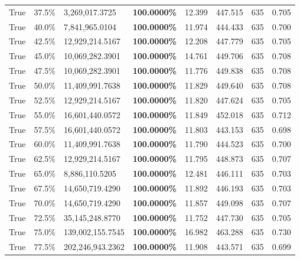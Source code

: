 \begin{table}[H]
\begin{tabular}{lllrllll}
\cline{1-8}
True & 37.5\% & 3,269,017.3725 & \bfseries \color{red} 100.0000\% & 12.399 & 447.515 & 635 & 0.705 \\
\cline{1-8}
True & 40.0\% & 7,841,965.0104 & \bfseries \color{red} 100.0000\% & 11.974 & 444.433 & 635 & 0.700 \\
\cline{1-8}
True & 42.5\% & 12,929,214.5167 & \bfseries \color{red} 100.0000\% & 12.208 & 447.779 & 635 & 0.705 \\
\cline{1-8}
True & 45.0\% & 10,069,282.3901 & \bfseries \color{red} 100.0000\% & 14.761 & 449.706 & 635 & 0.708 \\
\cline{1-8}
True & 47.5\% & 10,069,282.3901 & \bfseries \color{red} 100.0000\% & 11.776 & 449.838 & 635 & 0.708 \\
\cline{1-8}
True & 50.0\% & 11,409,991.7638 & \bfseries \color{red} 100.0000\% & 11.829 & 449.640 & 635 & 0.708 \\
\cline{1-8}
True & 52.5\% & 12,929,214.5167 & \bfseries \color{red} 100.0000\% & 11.820 & 447.624 & 635 & 0.705 \\
\cline{1-8}
True & 55.0\% & 16,601,440.0572 & \bfseries \color{red} 100.0000\% & 11.849 & 452.018 & 635 & 0.712 \\
\cline{1-8}
True & 57.5\% & 16,601,440.0572 & \bfseries \color{red} 100.0000\% & 11.803 & 443.153 & 635 & 0.698 \\
\cline{1-8}
True & 60.0\% & 11,409,991.7638 & \bfseries \color{red} 100.0000\% & 11.790 & 444.523 & 635 & 0.700 \\
\cline{1-8}
True & 62.5\% & 12,929,214.5167 & \bfseries \color{red} 100.0000\% & 11.795 & 448.873 & 635 & 0.707 \\
\cline{1-8}
True & 65.0\% & 8,886,110.5205 & \bfseries \color{red} 100.0000\% & 12.481 & 446.111 & 635 & 0.703 \\
\cline{1-8}
True & 67.5\% & 14,650,719.4290 & \bfseries \color{red} 100.0000\% & 11.892 & 446.193 & 635 & 0.703 \\
\cline{1-8}
True & 70.0\% & 14,650,719.4290 & \bfseries \color{red} 100.0000\% & 11.857 & 449.098 & 635 & 0.707 \\
\cline{1-8}
True & 72.5\% & 35,145,248.8770 & \bfseries \color{red} 100.0000\% & 11.752 & 447.730 & 635 & 0.705 \\
\cline{1-8}
True & 75.0\% & 139,002,155.7545 & \bfseries \color{red} 100.0000\% & 16.982 & 463.288 & 635 & 0.730 \\
\cline{1-8}
True & 77.5\% & 202,246,943.2362 & \bfseries \color{red} 100.0000\% & 11.908 & 443.571 & 635 & 0.699 \\

\end{tabular}
\end{table}
